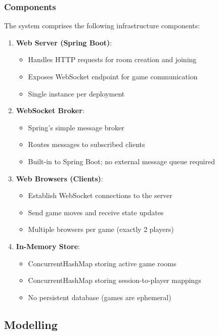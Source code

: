 \documentclass{scrartcl}
\begin{document}
\subsubsection{Components}

The system comprises the following infrastructure components:

\begin{enumerate}
  \item \textbf{Web Server (Spring Boot)}:
  \begin{itemize}
    \item Handles HTTP requests for room creation and joining
    \item Exposes WebSocket endpoint for game communication
    \item Single instance per deployment
  \end{itemize}

  \item \textbf{WebSocket Broker}:
  \begin{itemize}
    \item Spring's simple message broker
    \item Routes messages to subscribed clients
    \item Built-in to Spring Boot; no external message queue required
  \end{itemize}

  \item \textbf{Web Browsers (Clients)}:
  \begin{itemize}
    \item Establish WebSocket connections to the server
    \item Send game moves and receive state updates
    \item Multiple browsers per game (exactly 2 players)
  \end{itemize}

  \item \textbf{In-Memory Store}:
  \begin{itemize}
    \item ConcurrentHashMap storing active game rooms
    \item ConcurrentHashMap storing session-to-player mappings
    \item No persistent database (games are ephemeral)
  \end{itemize}
\end{enumerate}



\subsection{Modelling}\label{modelling}
\end{document}
